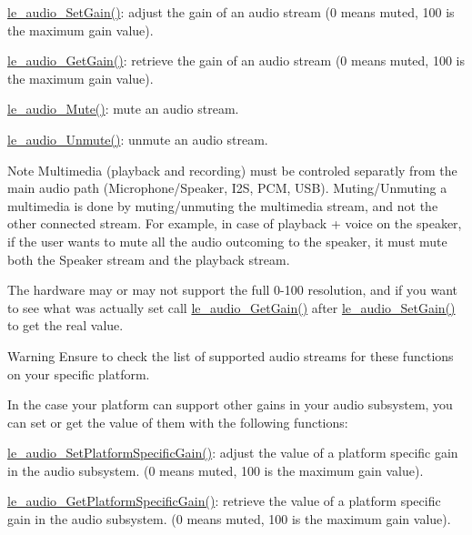 \begin{DoxyItemize}
\item \hyperlink{le__audio__interface_8h_ad62587dacf0cb087697a62fb9f41d938}{le\+\_\+audio\+\_\+\+Set\+Gain()}\+: adjust the gain of an audio stream (0 means \textquotesingle{}muted\textquotesingle{}, 100 is the maximum gain value).
\item \hyperlink{le__audio__interface_8h_a51a86829cdd6f27234f482e5dbb6c933}{le\+\_\+audio\+\_\+\+Get\+Gain()}\+: retrieve the gain of an audio stream (0 means \textquotesingle{}muted\textquotesingle{}, 100 is the maximum gain value).
\item \hyperlink{le__audio__interface_8h_a147e97c49dbc003f63df78f97d5fca32}{le\+\_\+audio\+\_\+\+Mute()}\+: mute an audio stream.
\item \hyperlink{le__audio__interface_8h_adad24547293481964039efe56bc14e2b}{le\+\_\+audio\+\_\+\+Unmute()}\+: unmute an audio stream.
\end{DoxyItemize}

\begin{DoxyNote}{Note}
Multimedia (playback and recording) must be controled separatly from the main audio path (Microphone/\+Speaker, I2\+S, P\+C\+M, U\+S\+B). Muting/\+Unmuting a multimedia is done by muting/unmuting the multimedia stream, and not the other connected stream. For example, in case of playback + voice on the speaker, if the user wants to mute all the audio outcoming to the speaker, it must mute both the Speaker stream and the playback stream.

The hardware may or may not support the full 0-\/100 resolution, and if you want to see what was actually set call \hyperlink{le__audio__interface_8h_a51a86829cdd6f27234f482e5dbb6c933}{le\+\_\+audio\+\_\+\+Get\+Gain()} after \hyperlink{le__audio__interface_8h_ad62587dacf0cb087697a62fb9f41d938}{le\+\_\+audio\+\_\+\+Set\+Gain()} to get the real value.
\end{DoxyNote}
\begin{DoxyWarning}{Warning}
Ensure to check the list of supported audio streams for these functions on your specific platform.
\end{DoxyWarning}
In the case your platform can support other gains in your audio subsystem, you can set or get the value of them with the following functions\+:


\begin{DoxyItemize}
\item \hyperlink{le__audio__interface_8h_ad9235b668cc80f33bc5045327be8bffb}{le\+\_\+audio\+\_\+\+Set\+Platform\+Specific\+Gain()}\+: adjust the value of a platform specific gain in the audio subsystem. (0 means \textquotesingle{}muted\textquotesingle{}, 100 is the maximum gain value).
\item \hyperlink{le__audio__interface_8h_a56269b13844a1e90be4e4c86f50bed5a}{le\+\_\+audio\+\_\+\+Get\+Platform\+Specific\+Gain()}\+: retrieve the value of a platform specific gain in the audio subsystem. (0 means \textquotesingle{}muted\textquotesingle{}, 100 is the maximum gain value).
\end{DoxyItemize}

